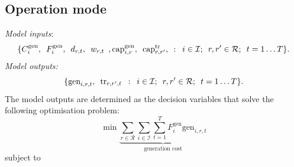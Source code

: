 \documentclass[preprint]{elsarticle}
\begin{document}
\subsection{Operation mode}
\label{sec:appendix:optimisation:model_4}
\noindent \textit{Model inputs}:
\begin{equation}
  \{C_{i}^\text{gen}, \hspace{0.5em} F_{i}^\text{gen}, \hspace{0.5em} d_{r, t}, \hspace{0.5em} w_{r, t} \hspace{0.5em}, \text{cap}_{i,r}^\text{gen}, \hspace{0.5em} \text{cap}_{r,r'}^\text{tr}, \hspace{0.5em} : \hspace{0.5em} i \in \mathcal{I}; \hspace{0.5em} r,r' \in \mathcal{R}; \hspace{0.5em} t = 1 \ldots T\}.
\label{eq:model_4:inputs}
\end{equation}
\textit{Model outputs:}
\begin{equation}
\{\text{gen}_{i,r,t}, \hspace{0.5em} \text{tr}_{r,r',t} \hspace{0.5em} : \hspace{0.5em} i \in \mathcal{I}; \hspace{0.5em} r,r' \in \mathcal{R}; \hspace{0.5em} t = 1 \ldots T\}.
\label{eq:model_4:decision_variables}
\end{equation}
The model outputs are determined as the decision variables that solve the following optimisation problem:
\begin{equation}
\min \underbrace{ \sum_{r \in \mathcal{R}} \sum_{i \in \mathcal{I}} \sum_{t=1}^{T} F_i^\text{gen} \text{gen}_{i,r,t}}_\text{generation cost}
\label{eq:model_4:objective}
\end{equation}
\noindent subject to
\end{document}
